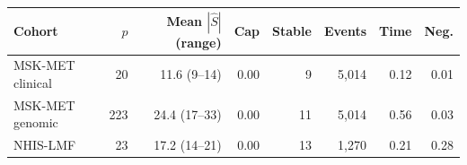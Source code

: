 \begin{tabular}{lrrrrrrr}
\toprule
Cohort & \(p\) & Mean \(|\widehat S|\) (range) & Cap & Stable & Events & Time & Neg.\\
\midrule
MSK-MET clinical & 20 & 11.6 (9--14) & 0.00 & 9 & 5,014 & 0.12 & 0.01\\
MSK-MET genomic & 223 & 24.4 (17--33) & 0.00 & 11 & 5,014 & 0.56 & 0.03\\
NHIS-LMF & 23 & 17.2 (14--21) & 0.00 & 13 & 1,270 & 0.21 & 0.28\\
\bottomrule
\end{tabular}
